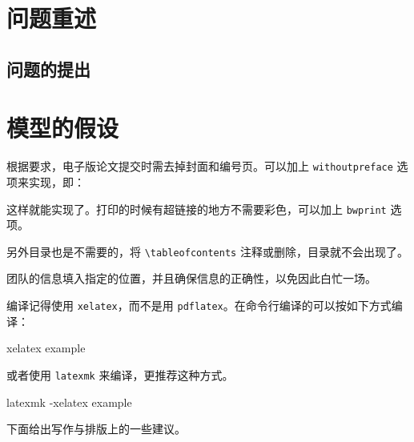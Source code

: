 \section{问题重述}
\subsection{问题的提出}

\section{模型的假设}

根据要求，电子版论文提交时需去掉封面和编号页。可以加上 \verb|withoutpreface|  选项来实现，即：
这样就能实现了。打印的时候有超链接的地方不需要彩色，可以加上 \verb|bwprint| 选项。

另外目录也是不需要的，将 \verb|\tableofcontents| 注释或删除，目录就不会出现了。

团队的信息填入指定的位置，并且确保信息的正确性，以免因此白忙一场。

编译记得使用 \verb|xelatex|，而不是用 \verb|pdflatex|。在命令行编译的可以按如下方式编译：
\begin{tcode}
	xelatex example
\end{tcode}
或者使用 \verb|latexmk| 来编译，更推荐这种方式。
\begin{tcode}
	latexmk -xelatex example
\end{tcode}

下面给出写作与排版上的一些建议。
